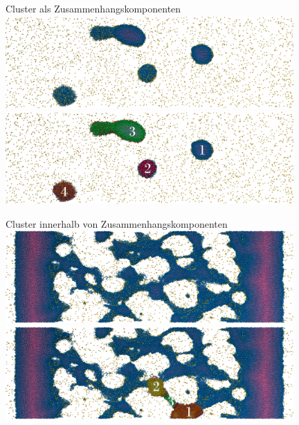 \documentclass[10pt]{beamer}
\begin{document}
\begin{frame}Cluster als Zusammenhangskomponenten
	\includegraphics*[width=11cm]{media/cluster/SignedDistanceColor-Frame-090-clipplane20-letterbox.png}\\
	\includegraphics*[width=11cm]{media/cluster/SignedDistanceColor-Frame-090-clipplane20-letterbox-Cluster.png}
\end{frame}

\begin{frame}Cluster innerhalb von Zusammenhangskomponenten
	\includegraphics*[width=11cm]{media/cluster/SignedDistanceColor-Frame-016-clipplane20-letterbox.png}\\
	\includegraphics*[width=11cm]{media/cluster/SignedDistanceColor-Frame-016-clipplane20-letterbox-Cluster.png}
\end{frame}
\end{document}
